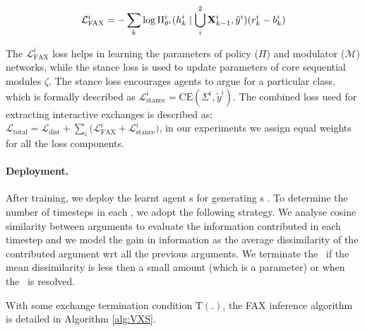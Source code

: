 \begin{equation}
\mathcal{L}^i_{\mathrm{FAX}} = -\sum_k \log \Pi^i_{\theta^i}(h^i_k \mid \bigcup_i^2 \mathbf{X}^{i}_{k-1}, \tilde{y}^i) (r^i_k - b^i_k)    
\label{eqn:FAX_loss}
\end{equation}

The $\mathcal{L}^i_{\mathrm{FAX}}$ loss helps in learning the parameters of policy ($\Pi$) and modulator ($\mathcal{M}$) networks, while the stance loss is used to update parameters of core sequential modules $\zeta$.
The stance loss encourages agents to argue for a particular class, which is formally described as $\mathcal{L}^i_{\mathrm{stance}} = \mathrm{CE}(\Sigma^i, \tilde{y}^i)$.
The combined loss used for extracting interactive exchanges is described as: $\mathcal{L}_{\mathrm{total}} = \mathcal{L}_{\mathrm{dist}} + \sum_i \Big(\mathcal{L}^i_{\mathrm{FAX}} + \mathcal{L}^i_{\mathrm{stance}}\Big)$, in our experiments we assign equal weights for all the loss components.

\fi
\paragraph{%
Deployment.}
After training, we deploy the learnt agent%
s for generating \FAXIC s%
.  
To determine the number of timesteps in each \FAXIC, we adopt the following strategy.
We analyse cosine similarity between arguments to evaluate the information contributed in each timestep %
and we model the gain in information as the average dissimilarity of the contributed argument wrt all the previous arguments.
We terminate the \FAXIC\ if the mean dissimilarity is %
less then a small amount (which is a parameter) or %
when the \FAXIC\ is resolved. 

\iffalse 

With some exchange termination condition $\mathrm{T}(.)$, the FAX inference algorithm is detailed in Algorithm \ref{alg:VXS}.

